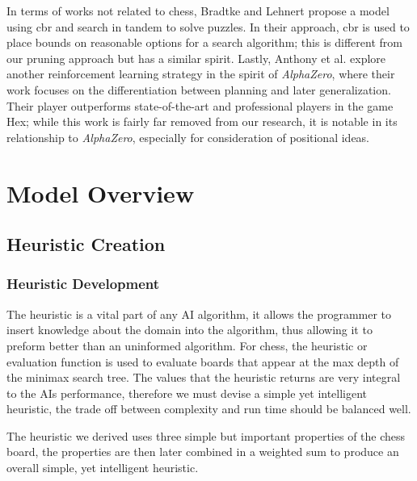 \documentclass[letterpaper]{article}
\begin{document}
In terms of works not related to chess, Bradtke and Lehnert \cite{bradtke-lehnert88} propose a model using \acrshort{cbr} and search in tandem to solve puzzles.  In their approach, \acrshort{cbr} is used to place bounds on reasonable options for a search algorithm; this is different from our pruning approach but has a similar spirit.  Lastly, Anthony et al. \cite{anthony-et-al2017} explore another reinforcement learning strategy in the spirit of \textit{AlphaZero}, where their work focuses on the differentiation between planning and later generalization.  Their player outperforms state-of-the-art and professional players in the game Hex; while this work is fairly far removed from our research, it is notable in its relationship to \textit{AlphaZero}, especially for consideration of positional ideas.

\section{Model Overview}
\subsection{Heuristic Creation}
\subsubsection{Heuristic Development}The heuristic is a vital part of any AI algorithm, it allows the programmer to insert knowledge about the domain into the algorithm, thus allowing it to preform better than an uninformed algorithm. For chess, the heuristic or evaluation function is used to evaluate boards that appear at the max depth of the minimax search tree. The values that the heuristic returns are very integral to the AIs performance, therefore we must devise a simple yet intelligent heuristic, the trade off between complexity and run time should be balanced well.  

The heuristic we derived uses three simple but important properties of the chess board, the properties are then later combined in a weighted sum to produce an overall simple, yet intelligent heuristic.
\end{document}
